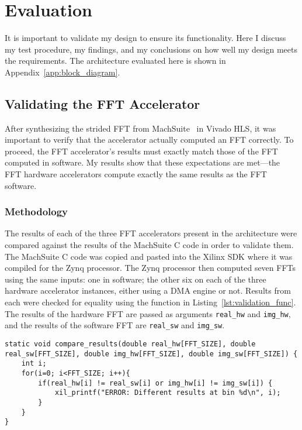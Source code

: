 \section{Evaluation}
It is important to validate my design to ensure its functionality. Here I discuss my test procedure, my findings, and my conclusions on how well my design meets the requirements. The architecture evaluated here is shown in Appendix~\ref{app:block_diagram}.

\subsection{Validating the FFT Accelerator}
After synthesizing the strided FFT from MachSuite~\cite{machsuite} in Vivado HLS, it was important to verify that the accelerator actually computed an FFT correctly. To proceed, the FFT accelerator's results must exactly match those of the FFT computed in software. My results show that these expectations are met---the FFT hardware accelerators compute exactly the same results as the FFT software.

\subsubsection{Methodology}
The results of each of the three FFT accelerators present in the architecture were compared against the results of the MachSuite C code in order to validate them. The MachSuite C code was copied and pasted into the Xilinx SDK where it was compiled for the Zynq processor. The Zynq processor then computed seven FFTs using the same inputs: one in software; the other six on each of the three hardware accelerator instances, either using a DMA engine or not. Results from each were checked for equality using the function in Listing~\ref{lst:validation_func}. The results of the hardware FFT are passed as arguments \texttt{real\_hw} and \texttt{img\_hw}, and the results of the software FFT are \texttt{real\_sw} and \texttt{img\_sw}.

\begin{lstlisting}[caption={FFT Validation Function},label={lst:validation_func}]
static void compare_results(double real_hw[FFT_SIZE], double real_sw[FFT_SIZE], double img_hw[FFT_SIZE], double img_sw[FFT_SIZE]) {
	int i;
	for(i=0; i<FFT_SIZE; i++){
		if(real_hw[i] != real_sw[i] or img_hw[i] != img_sw[i]) {
			xil_printf("ERROR: Different results at bin %d\n", i);
		}
	}
}
\end{lstlisting}

